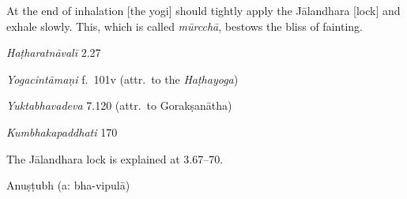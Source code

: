 \begin{ekdosis}
\begin{translation}[hp02_070]
At the end of inhalation [the yogi] should tightly apply the Jālandhara [lock] and exhale slowly. This, which is called \emph{mūrcchā}, bestows the bliss of  fainting.
\end{translation}

\begin{sources}[hp02_070]
\emph{Haṭharatnāvalī} 2.27

\begin{versinnote}
\end{versinnote}

\emph{Yogacintāmaṇi} f.~101v (attr.~to the \emph{Haṭhayoga})

\begin{versinnote}
\end{versinnote}

\emph{Yuktabhavadeva} 7.120 (attr.~to Gorakṣanātha)

\begin{versinnote}
\end{versinnote}

\emph{Kumbhakapaddhati} 170

\begin{versinnote}
\end{versinnote}
\end{sources}

\begin{philcomm}[hp02_070]
The Jālandhara lock is explained at 3.67–70. 
\end{philcomm}

\begin{metre}[hp02_070]
Anuṣṭubh (a: bha-vipulā)
\end{metre}


\end{ekdosis}
